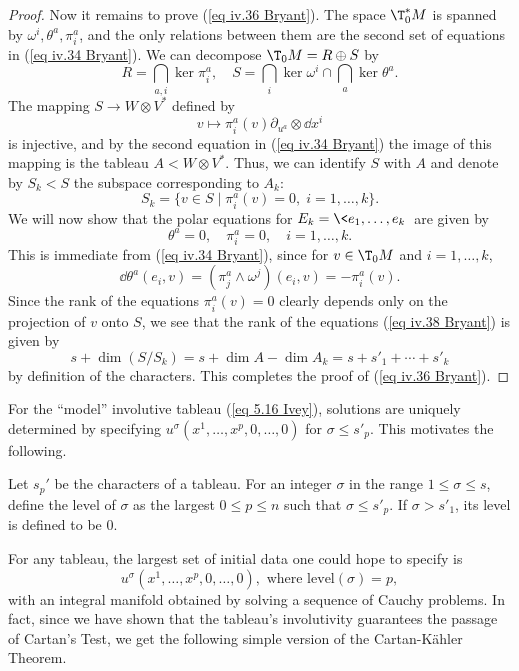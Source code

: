 \begin{proof}
    Now it remains to prove (\ref{eq iv.36 Bryant}). The space $\T_0^\ast M$ is spanned by $\omega^i,\theta^a,\pi^a_i$, and the only relations between them are the second set of equations in (\ref{eq iv.34 Bryant}). We can decompose $\T_0 M=R\oplus S$ by 
    \[R=\bigcap_{a,i}\ker \pi^a_i,\quad S=\bigcap_{i}\ker \omega^i\cap\bigcap_{a}\ker\theta^a. \]
    The mapping $S\to W\otimes V^\ast$ defined by 
    \[v\mapsto \pi^a_i(v)\partial_{u^a}\otimes \dd x^i\]
    is injective, and by the second equation in (\ref{eq iv.34 Bryant}) the image of this mapping is the tableau $A<W\otimes V^\ast$. Thus, we can identify $S$ with $A$ and denote by $S_k<S$ the subspace corresponding to $A_k$:
    \[S_k=\{v\in S\mid \pi^a_i(v)=0,\; i=1,\ldots,k\}.\]
    We will now show that the polar equations for $E_k=\<e_1,\ldots,e_k\>$ are given by 
    \[\theta^a=0,\quad \pi^a_i=0,\quad i=1,\ldots,k.\label{eq iv.38 Bryant}\]
    This is immediate from (\ref{eq iv.34 Bryant}), since for $v\in\T_0 M$ and $i=1,\ldots,k$,
    \[\dd\theta^a(e_i,v)=(\pi^a_j\wedge\omega^j)(e_i,v)=-\pi^a_i(v).\]
    Since the rank of the equations $\pi^a_i(v)=0$ clearly depends only on the projection of $v$ onto $S$, we see that the rank of the equations (\ref{eq iv.38 Bryant}) is given by 
    \[s+\dim(S\slash S_k)=s+\dim A-\dim A_k=s+s'_1+\cdots+s'_k\]
    by definition of the characters. This completes the proof of (\ref{eq iv.36 Bryant}).
\end{proof}


For the ``model'' involutive tableau (\ref{eq 5.16 Ivey}), solutions are uniquely determined by specifying $u^\sigma(x^1,\ldots,x^p,0,\ldots,0)$ for $\sigma\leq s'_p$. This motivates the following.

\begin{defn}[Level]
    Let $s_p'$ be the characters of a tableau. For an integer $\sigma$ in the range $1\leq \sigma\leq s$, define the level of $\sigma$ as the largest $0\leq p\leq n$ such that $\sigma\leq s'_p$. If $\sigma>s'_1$, its level is defined to be $0$.
\end{defn}

For any tableau, the largest set of initial data one could hope to specify is 
\[u^\sigma(x^1,\ldots,x^p,0,\ldots,0),\text{ where }\mathrm{level}(\sigma)=p,\label{eq 5.19 Ivey}\]
with an integral manifold obtained by solving a sequence of Cauchy problems. In fact, since we have shown that the tableau's involutivity guarantees the passage of Cartan's Test, we get the following simple version of the Cartan-K\"ahler Theorem.

